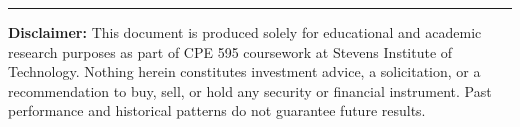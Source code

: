 \documentclass[12pt, letterpaper]{article}
\begin{document}
\vspace{1em}
\noindent\rule{\textwidth}{0.4pt}
\small
\textbf{Disclaimer:} This document is produced solely for educational and academic research purposes as part of CPE 595 coursework at Stevens Institute of Technology. Nothing herein constitutes investment advice, a solicitation, or a recommendation to buy, sell, or hold any security or financial instrument. Past performance and historical patterns do not guarantee future results.
\end{document}

